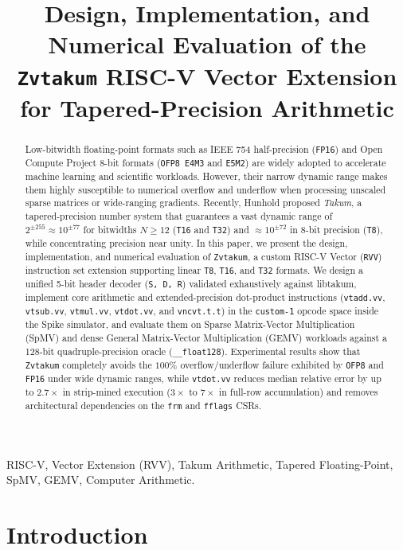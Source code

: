 \documentclass[conference]{IEEEtran}
\title{Design, Implementation, and Numerical Evaluation of the \texttt{Zvtakum} RISC-V Vector Extension for Tapered-Precision Arithmetic}
\author{
\IEEEauthorblockN{Rafael Estev\~ao and Glaucia Marques Figueiredo}
\IEEEauthorblockA{Departamento de Engenharia Eletr\^onica (DELT) --- Universidade Federal de Minas Gerais (UFMG)\\
Belo Horizonte, MG, Brazil\\
Email: rafaelestevao@ufmg.com, figueiredoglaucia56@gmail.com}
}
\begin{document}
\maketitle

\begin{abstract}
Low-bitwidth floating-point formats such as IEEE 754 half-precision (\texttt{FP16}) and Open Compute Project 8-bit formats (\texttt{OFP8 E4M3} and \texttt{E5M2}) are widely adopted to accelerate machine learning and scientific workloads. However, their narrow dynamic range makes them highly susceptible to numerical overflow and underflow when processing unscaled sparse matrices or wide-ranging gradients. Recently, Hunhold proposed \emph{Takum}, a tapered-precision number system that guarantees a vast dynamic range of $2^{\pm 255} \approx 10^{\pm 77}$ for bitwidths $N \ge 12$ (\texttt{T16} and \texttt{T32}) and $\approx 10^{\pm 72}$ in 8-bit precision (\texttt{T8}), while concentrating precision near unity. In this paper, we present the design, implementation, and numerical evaluation of \texttt{Zvtakum}, a custom RISC-V Vector (\texttt{RVV}) instruction set extension supporting linear \texttt{T8}, \texttt{T16}, and \texttt{T32} formats. We design a unified 5-bit header decoder (\texttt{S, D, R}) validated exhaustively against libtakum, implement core arithmetic and extended-precision dot-product instructions (\texttt{vtadd.vv}, \texttt{vtsub.vv}, \texttt{vtmul.vv}, \texttt{vtdot.vv}, and \texttt{vncvt.t.t}) in the \texttt{custom-1} opcode space inside the Spike simulator, and evaluate them on Sparse Matrix-Vector Multiplication (SpMV) and dense General Matrix-Vector Multiplication (GEMV) workloads against a 128-bit quadruple-precision oracle (\texttt{\_\_float128}). Experimental results show that \texttt{Zvtakum} completely avoids the $100\%$ overflow/underflow failure exhibited by \texttt{OFP8} and \texttt{FP16} under wide dynamic ranges, while \texttt{vtdot.vv} reduces median relative error by up to $2.7\times$ in strip-mined execution ($3\times$ to $7\times$ in full-row accumulation) and removes architectural dependencies on the \texttt{frm} and \texttt{fflags} CSRs.
\end{abstract}

\begin{IEEEkeywords}
RISC-V, Vector Extension (RVV), Takum Arithmetic, Tapered Floating-Point, SpMV, GEMV, Computer Arithmetic.
\end{IEEEkeywords}

\section{Introduction}
\label{sec:intro}
\end{document}
